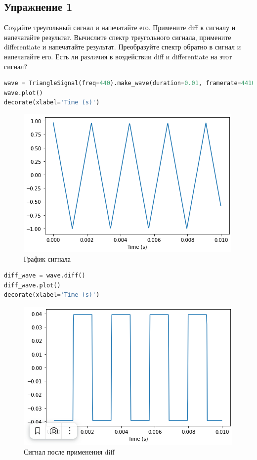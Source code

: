 \subsection{Упражнение 1}

Создайте треугольный сигнал и напечатайте его. Примените diff к сигналу и напечатайте результат. Вычислите спектр треугольного сигнала, примените differentiate и напечатайте результат. Преобразуйте спектр обратно в сигнал и напечатайте его. Есть ли различия в воздействии diff и differentiate на этот сигнал?

\begin{lstlisting}[language=Python]
wave = TriangleSignal(freq=440).make_wave(duration=0.01, framerate=44100)
wave.plot()
decorate(xlabel='Time (s)')
\end{lstlisting}
\begin{figure}[H]
	\begin{center}
		\includegraphics[scale=1]{fig/lab09/lab9_1.png}
		\caption{График сигнала}
	\end{center}
\end{figure}

\begin{lstlisting}[language=Python]
diff_wave = wave.diff()
diff_wave.plot()
decorate(xlabel='Time (s)')
\end{lstlisting}
\begin{figure}[H]
	\begin{center}
		\includegraphics[scale=1]{fig/lab09/lab9_2.png}
		\caption{Сигнал после применения diff}
	\end{center}
\end{figure}

